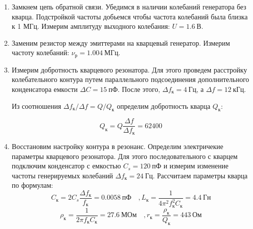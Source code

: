 \documentclass[14pt, a4paper]{article}
\begin{document}
\begin{enumerate}

\item Замкнем цепь обратной связи. Убедимся в наличии колебаний генератора без кварца. Подстройкой частоты добьемся чтобы частота колебаний была близка к 1 МГц. Измерим амплитуду выходного колебания: $U=1.6\ В$.

\item Заменим резистор между эмиттерами на кварцевый генератор. Измерим частоту колебаний: $\nu_р=1.004\ МГц$.

\item Измерим добротность кварцевого резонатора. Для этого проведем расстройку колебательного контура путем параллельного подсоединения дополнительного конденсатора емкости $\Delta C=15\ пФ$. После этого, $\Delta f_к=4\ Гц$, а $\Delta f=12\ кГц$.

Из соотношения $\Delta f_к/\Delta f=Q/Q_к$ определим добротность кварца $Q_к$:

\[Q_к=Q\frac{\Delta f}{\Delta f_к}=62400\]

\item Восстановим настройку контура в резонанс. Определим электричекие параметры кварцевого резонатора. Для этого последовательного с кварцем подключим конденсатор с емкостью $C_s=120\ пФ$ и измерим изменение частоты генерируемых колебаний $\Delta f_к=24\ Гц$. Рассчитаем параметры кварца по формулам:
\[C_к=2C_s\frac{\Delta f_к}{f_к}=0.0058\ пФ\quad, L_к=\frac{1}{4\pi^2 f_к^2 C_к}=4.4\ Гн\]
\[\rho_к=\frac{1}{2\pi f_к C_к}=27.6\ МОм\quad, r_к=\frac{\rho_к}{Q_к}=443\ Ом\]

\end{enumerate}
\end{document}
